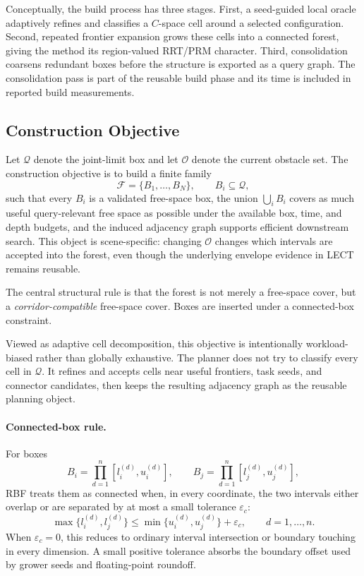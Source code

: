 \documentclass[journal]{IEEEtran}
\DeclareRobustCommand{\textsc}[1]{\textnormal{\MakeUppercase{#1}}}
\newcommand{\rbf}{\textsc{RBF}}
\newcommand{\calO}{\ensuremath{\mathcal{O}}}
\newcommand{\Q}{\ensuremath{\mathcal{Q}}}
\begin{document}
Conceptually, the build process has three stages. First, a seed-guided local
oracle adaptively refines and classifies a $C$-space cell around a selected
configuration. Second, repeated frontier expansion grows these cells into a
connected forest, giving the method its region-valued RRT/PRM character. Third,
consolidation coarsens redundant boxes before the structure is exported as a
query graph. The consolidation pass is part of the reusable build phase and its
time is included in reported build measurements.

\subsection{Construction Objective}\label{sec:forest_objective}

Let $\Q$ denote the joint-limit box and let $\calO$ denote the current obstacle
set. The construction objective is to build a finite family
\[
\mathcal{F} = \{B_1,\dots,B_N\}, \qquad B_i \subseteq \Q,
\]
such that every $B_i$ is a validated free-space box, the union
$\bigcup_i B_i$ covers as much useful query-relevant free space as possible
under the available box, time, and depth budgets, and the induced adjacency
graph supports efficient downstream search. This object is scene-specific:
changing $\calO$ changes which intervals are accepted into the forest, even
though the underlying envelope evidence in LECT remains reusable.

The central structural rule is that the forest is not merely a free-space cover,
but a \emph{corridor-compatible} free-space cover. Boxes are inserted
under a connected-box constraint.

Viewed as adaptive cell decomposition, this objective is intentionally
workload-biased rather than globally exhaustive. The planner does not try to
classify every cell in $\Q$. It refines and accepts cells near useful frontiers,
task seeds, and connector candidates, then keeps the resulting adjacency graph
as the reusable planning object.

\paragraph{Connected-box rule.}
For boxes
\[
B_i = \prod_{d=1}^{n}[l_i^{(d)},u_i^{(d)}],
\qquad
B_j = \prod_{d=1}^{n}[l_j^{(d)},u_j^{(d)}],
\]
\rbf{} treats them as connected when, in every coordinate, the two intervals
either overlap or are separated by at most a small tolerance $\varepsilon_c$:
\[
\max\{l_i^{(d)},l_j^{(d)}\}
\le
\min\{u_i^{(d)},u_j^{(d)}\}+\varepsilon_c,
\qquad d=1,\ldots,n.
\]
When $\varepsilon_c=0$, this reduces to ordinary interval intersection or
boundary touching in every dimension. A small positive tolerance absorbs the
boundary offset used by grower seeds and floating-point roundoff.
\end{document}
